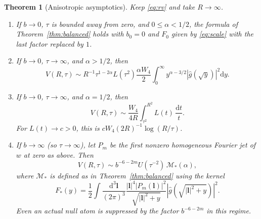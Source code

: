 \documentclass[11pt]{article}
\newtheorem{theorem}{Theorem}[section]
\theoremstyle{remark}
\newcommand{\dd}{\mathrm d}
\begin{document}
\begin{theorem}[Anisotropic asymptotics]
\label{thm:anisotropic}
Keep \eqref{eq:rv} and take \(R\to\infty\).
\begin{enumerate}
\item If \(b\to0\), \(\tau\) is bounded away from zero, and
\(0\le\alpha<1/2\), the formula of Theorem~\ref{thm:balanced}
holds with \(b_0=0\) and \(F_0\) given by \eqref{eq:scale}
with the last factor replaced by \(1\).
\item If \(b\to0\), \(\tau\to\infty\), and \(\alpha>1/2\), then
\begin{equation}
 V(R,\tau)\sim R^{-1}\tau^{1-2\alpha}L(\tau^2)
       \frac{\alpha W_4}{2}\int_0^\infty
                     y^{\alpha-3/2}|\widehat g(\sqrt y)|^2\dd y .
 \label{eq:shortsuper}
\end{equation}
\item If \(b\to0\), \(\tau\to\infty\), and \(\alpha=1/2\), then
\begin{equation}
       V(R,\tau)\sim\frac{W_4}{4R}
                     \int_{\tau^2}^{R^2} L(t)\,\frac{\dd t}{t}.
 \label{eq:shortcritical}
\end{equation}
For \(L(t)\to c>0\), this is
\(cW_4(2R)^{-1}\log(R/\tau)\).
\item If \(b\to\infty\) (so \(\tau\to\infty\)), let \(P_m\) be the first nonzero
homogeneous Fourier jet of \(w\) at zero as above. Then
\begin{equation}
 V(R,\tau)\sim b^{-6-2m}U(\tau^{-2})\,\mathcal M_*(\alpha),
 \label{eq:long}
\end{equation}
where \(\mathcal M_*\) is defined as in Theorem~\ref{thm:balanced}
using the kernel
\[
 F_*(y)=\frac12\int\frac{\dd^3\boldsymbol l}{(2\pi)^3}
 \frac{|\boldsymbol l|^4|P_m(\boldsymbol l)|^2}
           {\sqrt{|\boldsymbol l|^2+y}}
          |\widehat g(\sqrt{|\boldsymbol l|^2+y})|^2 .
\]
Even an actual null atom is suppressed by the factor
\(b^{-6-2m}\) in this regime.
\end{enumerate}
\end{theorem}
\end{document}
